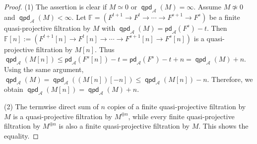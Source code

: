 \documentclass[10pt, a4paper,reqno]{amsart}
\theoremstyle{definition}
\theoremstyle{remark}
\numberwithin{equation}{thm}
\def\FF{\mathbb{F}}
\def\cA{\mathcal{A}}
\def\pd{\mathsf{pd}}
\def\qpd{\operatorname{\mathsf{qpd}}}
\begin{document}
\begin{proof}
(1) The assertion is clear if $M \simeq 0$ or $\qpd_\cA(M) = \infty$.
Assume $M \not\simeq 0$ and $\qpd_\cA(M) < \infty$.
Let $\FF = (F^{t+1} \to F^t \to \cdots \to F^{s+1} \to F^s)$ be a finite quasi-projective filtration by $M$ with $\qpd_\cA(M) = \pd_\cA(F^s)-t$.
Then $\FF[n] := (F^{t+1}[n] \to F^t[n] \to \cdots \to F^{s+1}[n] \to F^s[n])$ is a quasi-projective filtration by $M[n]$. 
Thus $\qpd_\cA(M[n]) \le \pd_\cA(F^s[n]) - t = \pd_\cA(F^s) - t + n = \qpd_\cA(M) + n$.
Using the same argument, $\qpd_{\cA}(M) = \qpd_\cA((M[n])[-n]) \le \qpd_\cA(M[n]) -n$.
Therefore, we obtain $\qpd_\cA(M[n]) = \qpd_\cA(M) + n$.

(2) The termwise direct sum of $n$ copies of a finite quasi-projective filtration by $M$ is a quasi-projective filtration by $M^{\oplus n}$, while every finite quasi-projective filtration by $M^{\oplus n}$ is also a finite quasi-projective filtration by $M$.
This shows the equality.


\end{proof}
\end{document}
